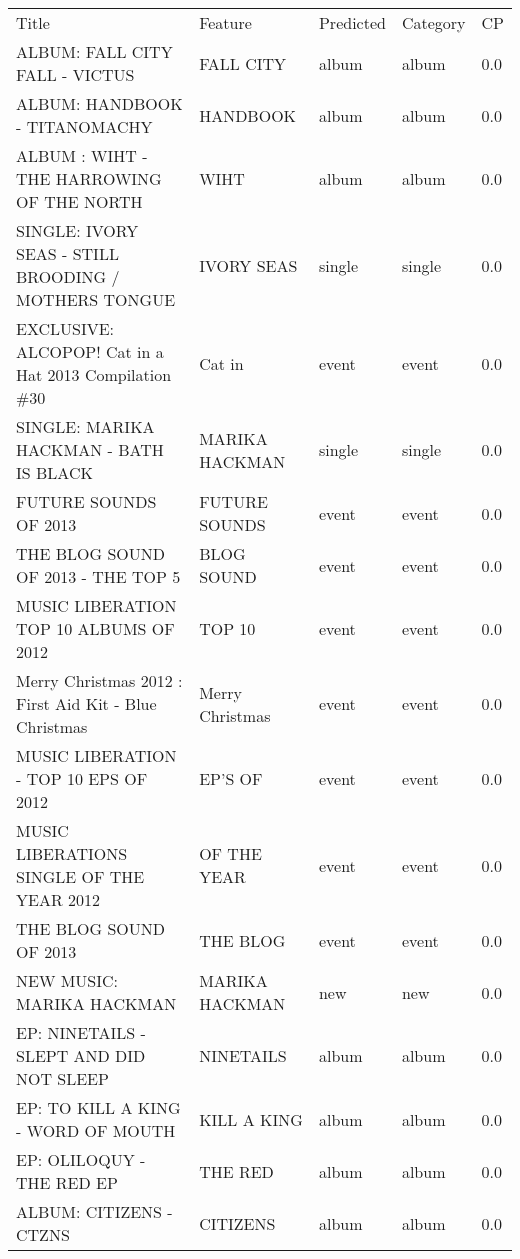 \begin{tabular}{ l l l l l }
\tiny Title & \tiny Feature & \tiny Predicted & \tiny Category & \tiny CP\\
\tiny ALBUM: FALL CITY FALL - VICTUS& \tiny FALL CITY& \tiny album& \tiny album& \tiny 0.0\\ 
\tiny ALBUM: HANDBOOK - TITANOMACHY& \tiny HANDBOOK& \tiny album& \tiny album& \tiny 0.0\\ 
\tiny ALBUM : WIHT - THE HARROWING OF THE NORTH& \tiny WIHT& \tiny album& \tiny album& \tiny 0.0\\ 
\tiny SINGLE: IVORY SEAS - STILL BROODING / MOTHERS TONGUE& \tiny IVORY SEAS& \tiny single& \tiny single& \tiny 0.0\\ 
\tiny EXCLUSIVE: ALCOPOP! Cat in a Hat 2013 Compilation \#30& \tiny Cat in& \tiny event& \tiny event& \tiny 0.0\\ 
\tiny SINGLE: MARIKA HACKMAN - BATH IS BLACK& \tiny MARIKA HACKMAN& \tiny single& \tiny single& \tiny 0.0\\ 
\tiny FUTURE SOUNDS OF 2013& \tiny FUTURE SOUNDS& \tiny event& \tiny event& \tiny 0.0\\ 
\tiny THE BLOG SOUND OF 2013 - THE TOP 5& \tiny BLOG SOUND& \tiny event& \tiny event& \tiny 0.0\\ 
\tiny MUSIC LIBERATION TOP 10 ALBUMS OF 2012& \tiny TOP 10& \tiny event& \tiny event& \tiny 0.0\\ 
\tiny Merry Christmas 2012 : First Aid Kit - Blue Christmas& \tiny Merry Christmas& \tiny event& \tiny event& \tiny 0.0\\ 
\tiny MUSIC LIBERATION - TOP 10 EPS OF 2012& \tiny EP'S OF& \tiny event& \tiny event& \tiny 0.0\\ 
\tiny MUSIC LIBERATIONS SINGLE OF THE YEAR 2012& \tiny OF THE YEAR& \tiny event& \tiny event& \tiny 0.0\\ 
\tiny THE BLOG SOUND OF 2013& \tiny THE BLOG& \tiny event& \tiny event& \tiny 0.0\\ 
\tiny NEW MUSIC: MARIKA HACKMAN& \tiny MARIKA HACKMAN& \tiny new& \tiny new& \tiny 0.0\\ 
\tiny EP: NINETAILS - SLEPT AND DID NOT SLEEP& \tiny NINETAILS& \tiny album& \tiny album& \tiny 0.0\\ 
\tiny EP: TO KILL A KING - WORD OF MOUTH& \tiny KILL A KING& \tiny album& \tiny album& \tiny 0.0\\ 
\tiny EP: OLILOQUY - THE RED EP& \tiny THE RED& \tiny album& \tiny album& \tiny 0.0\\ 
\tiny ALBUM: CITIZENS - CTZNS& \tiny CITIZENS& \tiny album& \tiny album& \tiny 0.0\\ 

\end{tabular}
